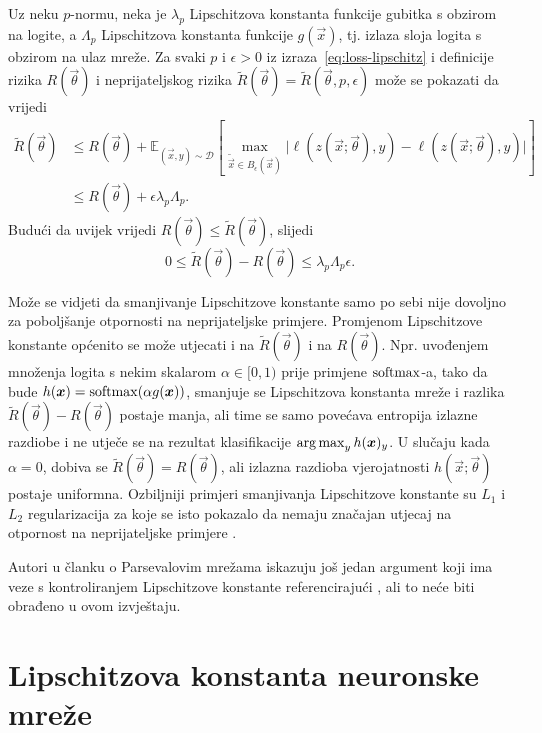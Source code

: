 \documentclass[utf8, seminar, numeric, lmodern]{feri}
\begin{document}
Uz neku $p$-normu, neka je $\lambda_p$ Lipschitzova konstanta funkcije gubitka s obzirom na logite, a $\Lambda_p$ Lipschitzova konstanta funkcije $g(\vec x)$, tj. izlaza sloja logita s obzirom na ulaz mreže. Za svaki $p$ i $\epsilon > 0$  iz izraza~\ref{eq:loss-lipschitz} i definicije rizika $R(\vec\theta)$ i neprijateljskog rizika $\widetilde{R}(\vec\theta)=\widetilde{R}(\vec\theta,p,\epsilon)$ može se pokazati da vrijedi
\begin{align}
\widetilde{R}(\vec\theta) 
&\leq R(\vec\theta) + \mathbb{E}_{(\vec x,y)\sim\mathcal{D}}\left[
\max_{\widetilde{\vec x} \in B_\epsilon(\vec x)} 
\lvert \ell(z(\vec x;\vec\theta),y)-\ell(z(\vec x;\vec\theta),y) \rvert \right] \\
&\leq R(\vec\theta) + \epsilon\lambda_p\Lambda_p.
\end{align}
Budući da uvijek vrijedi $R(\vec\theta) \leq \widetilde{R}(\vec\theta)$, slijedi
\begin{equation}
0 \leq \widetilde{R}(\vec\theta)-R(\vec\theta) \leq \lambda_p\Lambda_p\epsilon.
\end{equation}

Može se vidjeti da smanjivanje Lipschitzove konstante samo po sebi nije dovoljno za poboljšanje otpornosti na neprijateljske primjere. Promjenom Lipschitzove konstante općenito se može utjecati i na $\widetilde{R}(\vec\theta)$ i na $R(\vec\theta)$. Npr. uvođenjem množenja logita s nekim skalarom $\alpha\in[0,1)$ prije primjene $\operatorname{softmax}$-a, tako da bude $h(\bm{x}) = \operatorname{softmax}(\alpha g(\bm{x}))$, smanjuje se Lipschitzova konstanta mreže i razlika $\widetilde{R}(\vec\theta)-R(\vec\theta)$ postaje manja, ali time se samo povećava entropija izlazne razdiobe i ne utječe se na rezultat klasifikacije $\operatorname*{arg\,max}_yh(\bm{x})_y$. U slučaju kada $\alpha=0$, dobiva se $\widetilde{R}(\vec\theta)=R(\vec\theta)$, ali izlazna razdioba vjerojatnosti $h(\vec x;\vec\theta)$ postaje uniformna. Ozbiljniji primjeri smanjivanja Lipschitzove konstante su $L_1$ i $L_2$ regularizacija za koje se isto pokazalo da nemaju značajan utjecaj na otpornost na neprijateljske primjere \cite{szegedy13-intrig-ipnn,goodfellow14-ehae}. 

Autori u članku o Parsevalovim mrežama iskazuju još jedan argument koji ima veze s kontroliranjem Lipschitzove konstante referencirajući \cite{xu-rg}, ali to neće biti obrađeno u ovom izvještaju.

\section{Lipschitzova konstanta neuronske mreže}
\end{document}
